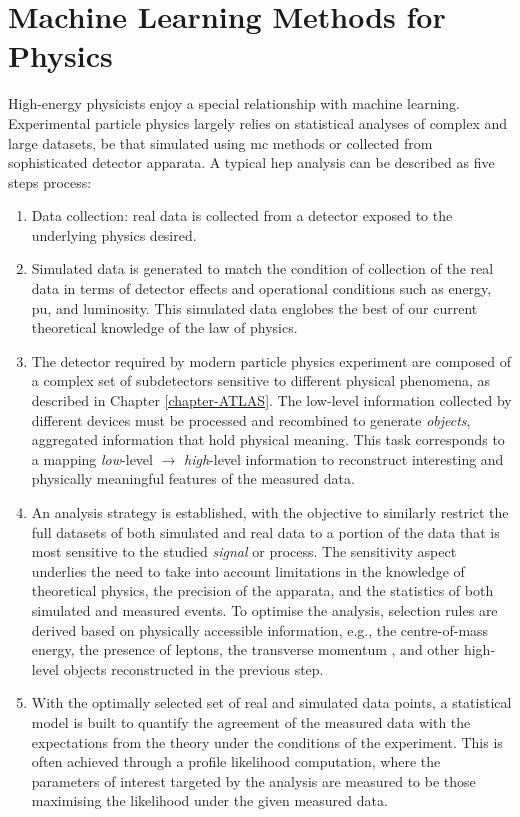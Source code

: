 \section{Machine Learning Methods for Physics}
High-energy physicists enjoy a special relationship with machine learning. Experimental particle physics largely relies on statistical analyses of complex and large datasets, be that simulated using \gls{mc} methods or collected from sophisticated detector apparata. A typical \gls{hep} analysis can be described as five steps process:
\begin{enumerate}
    \item Data collection: real data is collected from a detector exposed to the underlying physics desired. 
    \item Simulated data is generated to match the condition of collection of the real data in terms of detector effects and operational conditions such as energy, \gls{pu}, and luminosity. This simulated data englobes the best of our current theoretical knowledge of the law of physics. 
    \item The detector required by modern particle physics experiment are composed of a complex set of subdetectors sensitive to different physical phenomena, as described in Chapter \ref{chapter-ATLAS}. The low-level information collected by different devices must be processed and recombined to generate \textit{objects}, aggregated information that hold physical meaning. This task corresponds to a mapping \textit{low}-level $\rightarrow$ \textit{high}-level information to reconstruct interesting and physically meaningful features of the measured data. 
    \item An analysis strategy is established, with the objective to similarly restrict the full datasets of both simulated and real data to a portion of the data that is most sensitive to the studied \textit{signal} or process. The sensitivity aspect underlies the need to take into account limitations in the knowledge of theoretical physics, the precision of the apparata, and the statistics of both simulated and measured events. To optimise the analysis, selection rules are derived based on physically accessible information, e.g., the centre-of-mass energy, the presence of leptons, the transverse momentum \pt, and other high-level objects reconstructed in the previous step.
    \item With the optimally selected set of real and simulated data points, a statistical model is built to quantify the agreement of the measured data with the expectations from the theory under the conditions of the experiment. This is often achieved through a profile likelihood computation, where the parameters of interest targeted by the analysis are measured to be those maximising the likelihood under the given measured data.
\end{enumerate}

